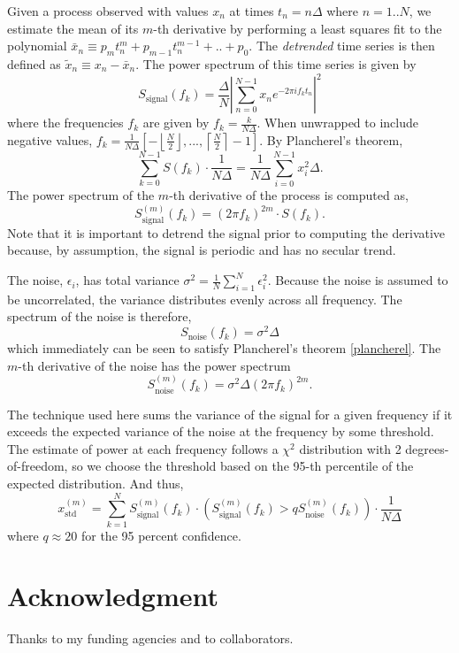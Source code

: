 \documentclass[10pt,journal]{IEEEtran}
\begin{document}
Given a process observed with values $x_n$ at times $t_n = n \Delta$ where $n=1..N$, we estimate the mean of its $m$-th derivative by performing a least squares fit to the polynomial $\bar{x}_n \equiv p_m t_n^m + p_{m-1} t_n^{m-1} + .. + p_0$. The \emph{detrended} time series is then defined as $\tilde{x}_n \equiv x_n - \bar{x}_n$. The power spectrum of this time series is given by
\begin{equation}
S_{\textrm{signal}}(f_k) = \frac{\Delta}{N} \left\lvert \sum_{n=0}^{N-1} x_n e^{-2\pi i f_k t_n} \right\rvert^2
\end{equation}
where the frequencies $f_k$ are given by $f_k = \frac{k}{N\Delta}$. When unwrapped to include negative values, $f_k = \frac{1}{N \Delta} \left[ -\left\lfloor \frac{N}{2} \right\rfloor,...,\left\lceil \frac{N}{2} \right\rceil -1 \right]$. By Plancherel's theorem,
\begin{equation}
\label{plancherel}
\sum_{k=0}^{N-1} S(f_k) \cdot \frac{1}{N \Delta} = \frac{1}{N \Delta} \sum_{i=0}^{N-1} x_i^2 \Delta.
\end{equation}
The power spectrum of the $m$-th derivative of the process is computed as,
\begin{equation}
S_{\textrm{signal}}^{(m)}(f_k) = (2 \pi f_k)^{2m} \cdot S(f_k).
\end{equation}
Note that it is important to detrend the signal prior to computing the derivative because, by assumption, the signal is periodic and has no secular trend.

The noise, $\epsilon_i$, has total variance $\sigma^2 = \frac{1}{N} \sum_{i=1}^{N} \epsilon_i^2$. Because the noise is assumed to be uncorrelated, the variance distributes evenly across all frequency. The spectrum of the noise is therefore,
\begin{equation}
S_{\textrm{noise}}(f_k) = \sigma^2 \Delta
\end{equation}
which immediately can be seen to satisfy Plancherel's theorem \ref{plancherel}. The $m$-th derivative of the noise has the power spectrum
\begin{equation}
S_{\textrm{noise}}^{(m)}(f_k) = \sigma^2 \Delta (2 \pi f_k)^{2m}.
\end{equation}

The technique used here sums the variance of the signal for a given frequency if it exceeds the expected variance of the noise at the frequency by some threshold. The estimate of power at each frequency follows a $\chi^2$ distribution with 2 degrees-of-freedom, so we choose the threshold based on the 95-th percentile of the expected distribution. And thus,
\begin{equation}
x^{(m)}_{\textrm{std}} = \sum_{k=1}^{N} S^{(m)}_{\textrm{signal}}(f_k) \cdot \left( S^{(m)}_{\textrm{signal}}(f_k) > q S_{\textrm{noise}}^{(m)}(f_k) \right) \cdot \frac{1}{N \Delta}
\end{equation}
where $q\approx 20$ for the 95 percent confidence.

\section*{Acknowledgment}
Thanks to my funding agencies and to collaborators. 



\end{document}
